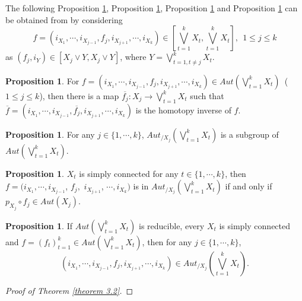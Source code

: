 \documentclass[12pt]{article}
\theoremstyle{theorem}
\theoremstyle{definition}
\theoremstyle{proposition}
\newtheorem{proposition}[theorem]{Proposition}
\theoremstyle{corollary}
\theoremstyle{lemma}
\theoremstyle{remark}
\theoremstyle{example}
\begin{document}
{The following Proposition \ref{proposition 3.3}, Proposition \ref{proposition 3.4}, Proposition \ref{proposition 3.5} and Proposition \ref{proposition 3.6} can be obtained from \cite{YS1} by considering
$$f=(i_{X_1},\cdots,i_{X_{j-1}},f_{j},i_{X_{j+1}},\cdots,i_{X_{k}})\in [\bigvee\limits_{t=1}^{k}X_{t}, \bigvee\limits_{t=1}^{k}X_{t}],  ~~ 1\leq j\leq k$$
as $(f_{j}, i_{Y})\in [X_{j}\vee Y, X_{j}\vee Y ]$, where $Y=\bigvee\limits_{t=1,t\neq j}^{k}X_{t}$.

\begin{proposition}\label{proposition 3.3}
For $f=(i_{X_1},\cdots,i_{X_{j-1}},f_{j},i_{X_{j+1}},\cdots,i_{X_{k}})\in Aut(\bigvee\limits_{t=1}^{k}X_{t})$~($1\leq j\leq k$), then there is a map $\overline{f_{j}}:X_{j}\rightarrow \bigvee\limits_{t=1}^{k}X_{t}$ such that $\overline{f}=(i_{X_1},\cdots,i_{X_{j-1}},\overline{f_{j}},i_{X_{j+1}},\cdots,i_{X_{k}})$ is the homotopy inverse of $f$.
\end{proposition}

\begin{proposition}\label{proposition 3.4}
For any $j\in\{1,\cdots,k\}$, ${\ensuremath{Aut_{/X_{{j}}}(\bigvee\limits_{t=1}^{k}X_{t})}}$ is a subgroup of  $ Aut(\bigvee\limits_{t=1}^{k}X_{t})$.
\end{proposition}

\begin{proposition}\label{proposition 3.5}
  $X_{t}$ is simply connected for any $t\in\{1,\cdots,k\}$, then $f=(i_{X_1},\cdots,i_{X_{j-1}}$, $f_{j},$ $i_{X_{j+1}}$, $\cdots,i_{X_{k}})$
  is in ${\ensuremath{Aut_{/X_{{j}}}(\bigvee\limits_{t=1}^{k}X_{t})}}$ if and only if $p_{X_{j}}{\ensuremath{{\scriptstyle\circ}}} f_{j}\in Aut(X_j)$.
\end{proposition}

\begin{proposition}\label{proposition 3.6}
If $ Aut(\bigvee\limits_{t=1}^{k}X_{t})$ is reducible, every $X_{t}$ is simply connected and $f=(f_{t})_{t=1}^{k}\in Aut(\bigvee\limits_{t=1}^{k}X_{t})$, then for any $j\in\{1,\cdots,k\}$,
$$(i_{X_1},\cdots,i_{X_{j-1}},f_{j},i_{X_{j+1}},\cdots,i_{X_{k}})\in{\ensuremath{Aut_{/X_{{j}}}(\bigvee\limits_{t=1}^{k}X_{t})}}.$$

\end{proposition}

\begin{proof}[Proof of Theorem \ref{theorem 3.2}]


\end{proof}}
\end{document}
